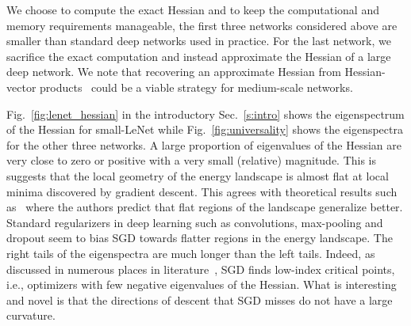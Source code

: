 \documentclass[10pt]{article}
\begin{document}
We choose to compute the exact Hessian and to keep the computational and memory requirements manageable, the first three networks considered above are smaller than standard deep networks used in practice. For the last network, we sacrifice the exact computation and instead approximate the Hessian of a large deep network. We note that recovering an approximate Hessian from Hessian-vector products~\citep{pearlmutter1994fast} could be a viable strategy for medium-scale networks.

Fig.~\ref{fig:lenet_hessian} in the introductory Sec.~\ref{s:intro} shows the eigenspectrum of the Hessian for small-LeNet while Fig.~\ref{fig:universality} shows the eigenspectra for the other three networks.
%
A large proportion of eigenvalues of the Hessian are very close to zero or positive with a very small (relative) magnitude. This is suggests that the local geometry of the energy landscape is almost flat at local minima discovered by gradient descent. This agrees with theoretical results such as~\citet{baldassi2016local} where the authors predict that flat regions of the landscape generalize better. Standard regularizers in deep learning such as convolutions, max-pooling and dropout seem to bias SGD towards flatter regions in the energy landscape.
%
The right tails of the eigenspectra are much longer than the left tails. Indeed, as discussed in numerous places in literature~\citep{Bray2007,dauphin2014identifying,spinglass2015}, SGD finds low-index critical points, i.e., optimizers with few negative eigenvalues of the Hessian. What is interesting and novel is that the directions of descent that SGD misses do not have a large curvature.
\end{document}
